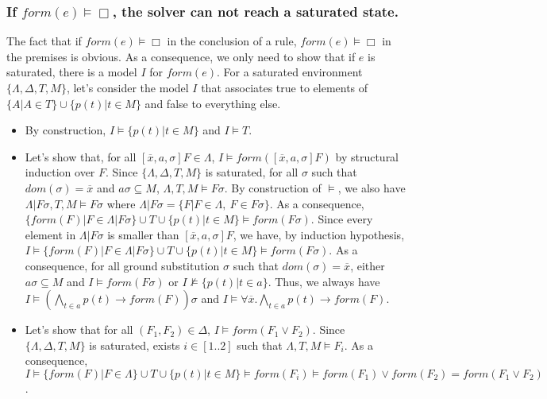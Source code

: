 \documentclass[a4paper,10pt]{report}
\newcommand{\F}{\mathit{form}}
\begin{document}
\subsubsection*{If $\F(e)\vDash\Box$, the solver can not reach a saturated state.}
The fact that if $\F(e)\vDash\Box$ in the conclusion of a rule, $\F(e)\vDash\Box$ in the premises
is obvious. As a consequence, we only need to show that if $e$ is saturated, there is a model $I$
for $\F(e)$. For a saturated environment $\{\Lambda,\Delta,T,M\}$, let's consider the model $I$
that associates true to elements of $\{A|A\in T\}\cup\{p(t)|t\in M\}$ and false to everything else.
\begin{itemize}
 \item By construction, $I\vDash\{p(t)|t\in M\}$ and $I\vDash T$.
 \item Let's show that, for all $[\overline x,a,\sigma]F\in\Lambda$, 
$I\vDash\F([\overline x,a,\sigma]F)$ by structural induction over $F$.
Since $\{\Lambda,\Delta,T,M\}$ is saturated, for all $\sigma$ such that
$dom(\sigma)=\overline x$ and $a\sigma\subseteq M$, $\Lambda,T,M\vDash F\sigma$.
By construction of $\vDash$, we also have $\Lambda|F\sigma,T,M\vDash F\sigma$ where
$\Lambda|F\sigma=\{F|F\in\Lambda,\ F\in F\sigma\}$.
As a consequence, $\{\F(F)|F\in\Lambda|F\sigma\}\cup T\cup\{p(t)|t\in M\}\vDash\F(F\sigma)$.
Since every element in $\Lambda|F\sigma$ is smaller than $[\overline x,a,\sigma]F$, 
we have, by induction hypothesis,
$I\vDash\{\F(F)|F\in\Lambda|F\sigma\}\cup T\cup\{p(t)|t\in M\}\vDash\F(F\sigma)$.
As a consequence, for all ground substitution $\sigma$ such that $dom(\sigma)=\overline x$,
either $a\sigma\subseteq M$ and $I\vDash\F(F\sigma)$ or $I\nvDash\{p(t)|t\in a\}$.
Thus, we always have $I\vDash(\bigwedge_{t\in a} p(t)\rightarrow\F(F))\sigma$ and
$I\vDash\forall \overline x.\bigwedge_{t\in a} p(t)\rightarrow\F(F)$.
 \item Let's show that for all $(F_1,F_2)\in\Delta$, $I\vDash\F(F_1\vee F_2)$. Since
$\{\Lambda,\Delta,T,M\}$ is saturated, exists $i\in[1..2]$ such that $\Lambda,T,M\vDash F_i$.
As a consequence, $I\vDash\{\F(F)|F\in\Lambda\}\cup T\cup\{p(t)|t\in M\}\vDash
\F(F_i)\vDash\F(F_1)\vee\F(F_2)=\F(F_1\vee F_2)$.
\end{itemize}
\end{document}
